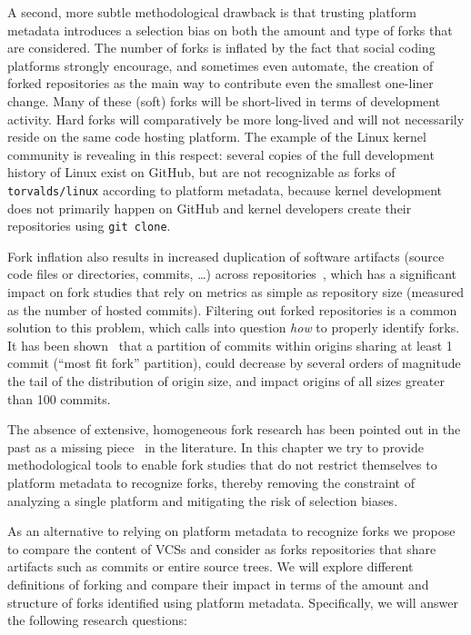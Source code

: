 A second, more subtle methodological drawback is that trusting platform
metadata introduces a selection bias on both the amount and type of forks that
are considered. The number of forks is inflated by the fact that social coding
platforms strongly encourage, and sometimes even automate, the creation of
forked repositories as the main way to contribute even the smallest one-liner
change.
Many of these (soft) forks will be short-lived in terms of development
activity. Hard forks will comparatively be more long-lived and will not
necessarily reside on the same code hosting platform. The example of the Linux
kernel community is revealing in this respect: several copies of the full
development history of Linux exist on GitHub, but are not recognizable as forks
of \texttt{torvalds/linux} according to platform metadata, because kernel
development does not primarily happen on GitHub and kernel developers create
their repositories using \texttt{git clone}.

Fork inflation also results in increased duplication of software artifacts
(source code files or directories, commits, \ldots) across
repositories~\cite{swh-provenance-emse}, which has a significant impact on fork
studies that rely on metrics as simple as repository size (measured as the
number of hosted commits). Filtering out forked repositories is a common
solution to this problem, which calls into question \emph{how} to properly
identify forks.
It has been shown~\cite{swh-provenance-emse} that a partition of commits within
origins sharing at least 1 commit (``most fit fork'' partition), could decrease
by several orders of magnitude the tail of the distribution of origin size, and
impact origins of all sizes greater than 100 commits.

\smallskip

The absence of extensive, homogeneous fork research has been pointed out in the
past as a missing piece~\cite{robles2012forks} in the literature. In this
chapter we try to provide methodological tools to enable fork studies that do
not restrict themselves to platform metadata to recognize forks, thereby
removing the constraint of analyzing a single platform and mitigating the risk
of selection biases.

As an alternative to relying on platform metadata to recognize forks we propose
to compare the content of \glspl{VCS} and consider as forks repositories that
share artifacts such as commits or entire source trees. We will explore
different definitions of forking and compare their impact in terms of the
amount and structure of forks identified using platform metadata. Specifically,
we will answer the following research questions:

